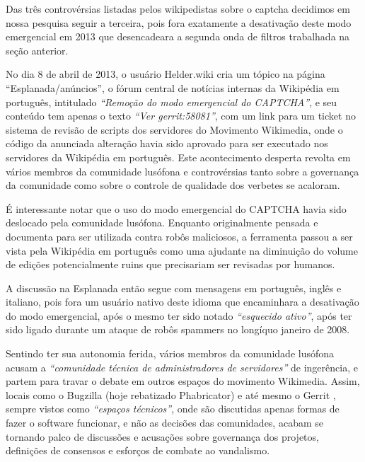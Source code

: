 Das três controvérsias listadas pelos wikipedistas sobre o captcha decidimos em nossa pesquisa seguir a terceira, pois fora exatamente a desativação deste modo emergencial em 2013 que desencadeara a segunda onda de filtros trabalhada na seção anterior.


No dia 8 de abril de 2013, o usuário Helder.wiki cria um tópico na página ``Esplanada/anúncios'', o fórum central de notícias internas da Wikipédia em português, intitulado \textit{``Remoção do modo emergencial do CAPTCHA''}, e seu conteúdo tem apenas o texto \textit{``Ver gerrit:58081''}, com um link para um ticket no sistema de revisão de scripts dos servidores do Movimento Wikimedia, onde o código da anunciada alteração havia sido aprovado para ser executado nos servidores da Wikipédia em português. Este acontecimento desperta revolta em vários membros da comunidade lusófona e controvérsias tanto sobre a governança da comunidade como sobre o controle de qualidade dos verbetes se acaloram. 

É interessante notar que o uso do modo emergencial do CAPTCHA havia sido deslocado pela comunidade lusófona. Enquanto originalmente pensada e documenta para ser utilizada contra robôs maliciosos, a ferramenta passou a ser vista pela Wikipédia em português como uma ajudante na diminuição do volume de edições potencialmente ruins que precisariam ser revisadas por humanos.

A discussão na Esplanada então segue com mensagens em português, inglês e italiano, pois fora um usuário nativo deste idioma que encaminhara a desativação do modo emergencial, após o mesmo  ter sido notado \textit{“esquecido ativo”}, após ter sido ligado durante um ataque de robôs spammers no longíquo janeiro de 2008.

Sentindo ter sua autonomia ferida, vários membros da comunidade lusófona acusam a \textit{“comunidade técnica de administradores de servidores”} de ingerência, e partem para travar o debate em outros espaços do movimento Wikimedia. Assim, locais como o Bugzilla (hoje rebatizado Phabricator) \citep{remove_ptwiki_ptwikinews_captcha_mode} e até mesmo o Gerrit , sempre vistos como \textit{``espaços técnicos''}, onde são discutidas apenas formas de fazer o software funcionar, e não as decisões das comunidades, acabam se tornando palco de discussões e acusações sobre governança dos projetos, definições de consensos e esforços de combate ao vandalismo.  

